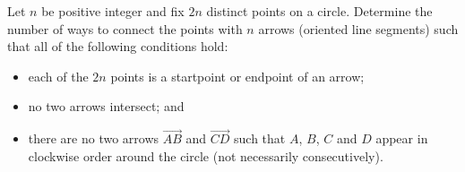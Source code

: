 Let $n$ be positive integer and fix $2n$ distinct points on a circle. Determine the number of ways to connect the points with $n$ arrows (oriented line segments) such that all of the following conditions hold:

\begin{itemize}
	\item each of the $2n$ points is a startpoint or endpoint of an arrow;
	\item no two arrows intersect; and 
	\item there are no two arrows $\overrightarrow{AB}$ and $\overrightarrow{CD}$ such that $A$, $B$, $C$ and $D$ appear in clockwise order around the circle (not necessarily consecutively). 
\end{itemize}
